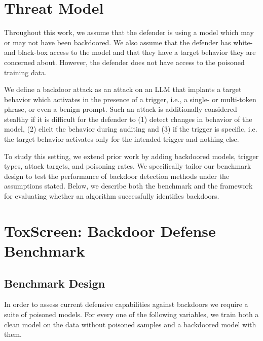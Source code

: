 \documentclass[letterpaper]{article} %
\begin{document}
\section{Threat Model} 
Throughout this work, we assume that the defender is using a model which may or may not have been backdoored.
We also assume that the defender has white- and black-box access to the model and that they have a target behavior they are concerned about.
However, the defender does not have access to the poisoned training data.

We define a backdoor attack as an attack on an LLM that implants a target behavior which activates in the presence of a trigger, i.e., a single- or multi-token phrase, or even a benign prompt.
Such an attack is additionally considered stealthy if it is difficult for the defender to (1) detect changes in behavior of the model, (2) elicit the behavior during auditing and (3) if the trigger is specific, i.e. the target behavior activates only for the intended trigger and nothing else.

To study this setting, we extend prior work \citep{li_backdoorllm_2025, sun_poisonforge_2026} by adding backdoored models, trigger types, attack targets, and poisoning rates.
We specifically tailor our benchmark design to test the performance of backdoor detection methods under the assumptions stated.
Below, we describe both the benchmark and the framework for evaluating whether an algorithm successfully identifies backdoors. 




\section{ToxScreen: Backdoor Defense Benchmark}
\label{sec:methodology}

\subsection{Benchmark Design}
In order to assess current defensive capabilities against backdoors we require a suite of poisoned models. For every one of the following variables, we train both a clean model on the data without poisoned samples and a backdoored model with them.
\end{document}
